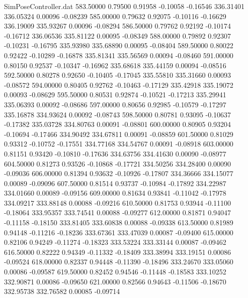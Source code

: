 \begin{filecontents}{SimPoseController.dat}
 583.50000    0.79500    0.91958    -0.10058   -0.16546  336.31401  336.05324    0.00096   -0.08239
 585.00000    0.79632    0.92075    -0.10116   -0.16629  336.19009  335.93267    0.00096   -0.08294
 586.50000    0.79762    0.92192    -0.10174   -0.16712  336.06536  335.81122    0.00095   -0.08349
 588.00000    0.79892    0.92307    -0.10231   -0.16795  335.93980  335.68890    0.00095   -0.08404
 589.50000    0.80022    0.92422    -0.10289   -0.16878  335.81341  335.56569    0.00094   -0.08460
 591.00000    0.80150    0.92537    -0.10347   -0.16962  335.68618  335.44159    0.00094   -0.08516
 592.50000    0.80278    0.92650    -0.10405   -0.17045  335.55810  335.31660    0.00093   -0.08572
 594.00000    0.80405    0.92762    -0.10463   -0.17129  335.42918  335.19072    0.00093   -0.08629
 595.50000    0.80531    0.92874    -0.10521   -0.17213  335.29941  335.06393    0.00092   -0.08686
 597.00000    0.80656    0.92985    -0.10579   -0.17297  335.16878  334.93624    0.00092   -0.08743
 598.50000    0.80781    0.93095    -0.10637   -0.17382  335.03728  334.80763    0.00091   -0.08801
 600.00000    0.80905    0.93204    -0.10694   -0.17466  334.90492  334.67811    0.00091   -0.08859
 601.50000    0.81029    0.93312    -0.10752   -0.17551  334.77168  334.54767    0.00091   -0.08918
 603.00000    0.81151    0.93420    -0.10810   -0.17636  334.63756  334.41630    0.00090   -0.08977
 604.50000    0.81273    0.93526    -0.10868   -0.17721  334.50256  334.28400    0.00090   -0.09036
 606.00000    0.81394    0.93632    -0.10926   -0.17807  334.36666  334.15077    0.00089   -0.09096
 607.50000    0.81514    0.93737    -0.10984   -0.17892  334.22987  334.01660    0.00089   -0.09156
 609.00000    0.81634    0.93841    -0.11042   -0.17978  334.09217  333.88148    0.00088   -0.09216
 610.50000    0.81753    0.93944    -0.11100   -0.18064  333.95357  333.74541    0.00088   -0.09277
 612.00000    0.81871    0.94047    -0.11158   -0.18150  333.81405  333.60838    0.00088   -0.09338
 613.50000    0.81989    0.94148    -0.11216   -0.18236  333.67361  333.47039    0.00087   -0.09400
 615.00000    0.82106    0.94249    -0.11274   -0.18323  333.53224  333.33144    0.00087   -0.09462
 616.50000    0.82222    0.94349    -0.11332   -0.18409  333.38994  333.19151    0.00086   -0.09524
 618.00000    0.82337    0.94448    -0.11390   -0.18496  333.24670  333.05060    0.00086   -0.09587
 619.50000    0.82452    0.94546    -0.11448   -0.18583  333.10252  332.90871    0.00086   -0.09650
 621.00000    0.82566    0.94643    -0.11506   -0.18670  332.95738  332.76582    0.00085   -0.09714

\end{filecontents}
